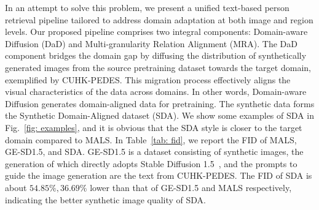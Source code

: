 In an attempt to solve this problem, we present a unified text-based person retrieval pipeline tailored to address domain adaptation at both image and region levels. 
Our proposed pipeline comprises two integral components: Domain-aware Diffusion (DaD) and Multi-granularity Relation Alignment (MRA). 
The DaD component bridges the domain gap by diffusing the distribution of synthetically generated images from the source pretraining dataset towards the target domain, exemplified by CUHK-PEDES. 
This migration process effectively aligns the visual characteristics of the data across domains. 
In other words, Domain-aware Diffusion generates domain-aligned data for pretraining. 
The synthetic data forms the Synthetic Domain-Aligned dataset (SDA). 
We show some examples of SDA in Fig.~\ref{fig: examples}, and it is obvious that the SDA style is closer to the target domain compared to MALS. 
In Table~\ref{tab: fid}, we report the FID of MALS, GE-SD1.5, and SDA. GE-SD1.5 is a dataset consisting of synthetic images, the generation of which directly adopts Stable Diffusion 1.5~\cite{sd15}, and the prompts to guide the image generation are the text from CUHK-PEDES. The FID of SDA is about $54.85\%, 36.69\%$ lower than that of GE-SD1.5 and MALS respectively, indicating the better synthetic image quality of SDA.

